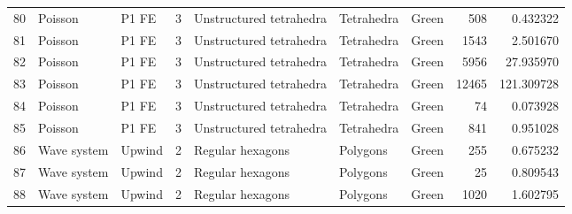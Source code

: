 \begin{tabular}{lllrlllrr}
80  &           Poisson &                          P1 FE &               3 &                   Unstructured tetrahedra &             Tetrahedra  &                                Green &                      508 &                         0.432322 \\
81  &           Poisson &                          P1 FE &               3 &                   Unstructured tetrahedra &             Tetrahedra  &                                Green &                     1543 &                         2.501670 \\
82  &           Poisson &                          P1 FE &               3 &                   Unstructured tetrahedra &             Tetrahedra  &                                Green &                     5956 &                        27.935970 \\
83  &           Poisson &                          P1 FE &               3 &                   Unstructured tetrahedra &             Tetrahedra  &                                Green &                    12465 &                       121.309728 \\
84  &           Poisson &                          P1 FE &               3 &                   Unstructured tetrahedra &             Tetrahedra  &                                Green &                       74 &                         0.073928 \\
85  &           Poisson &                          P1 FE &               3 &                   Unstructured tetrahedra &             Tetrahedra  &                                Green &                      841 &                         0.951028 \\
86  &       Wave system &                         Upwind &               2 &                          Regular hexagons &               Polygons  &                                Green &                      255 &                         0.675232 \\
87  &       Wave system &                         Upwind &               2 &                          Regular hexagons &               Polygons  &                                Green &                       25 &                         0.809543 \\
88  &       Wave system &                         Upwind &               2 &                          Regular hexagons &               Polygons  &                                Green &                     1020 &                         1.602795 \\

\end{tabular}
